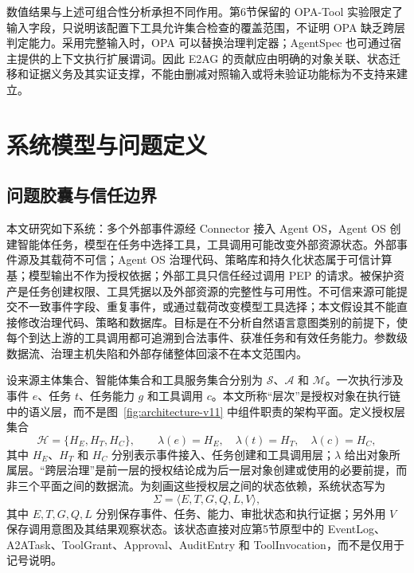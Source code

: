数值结果与上述可组合性分析承担不同作用。第6节保留的 OPA-Tool 实验限定了输入字段，只说明该配置下工具允许集合检查的覆盖范围，不证明 OPA 缺乏跨层判定能力。采用完整输入时，OPA 可以替换治理判定器；AgentSpec 也可通过宿主提供的上下文执行扩展谓词。因此 E2AG 的贡献应由明确的对象关联、状态迁移和证据义务及其实证支撑，不能由删减对照输入或将未验证功能标为不支持来建立。

\section{系统模型与问题定义}\label{sec:problem-v11}

\subsection{问题胶囊与信任边界}

本文研究如下系统：多个外部事件源经 Connector 接入 Agent OS，Agent OS 创建智能体任务，模型在任务中选择工具，工具调用可能改变外部资源状态。外部事件源及其载荷不可信；Agent OS 治理代码、策略库和持久化状态属于可信计算基；模型输出不作为授权依据；外部工具只信任经过调用 PEP 的请求。被保护资产是任务创建权限、工具凭据以及外部资源的完整性与可用性。不可信来源可能提交不一致事件字段、重复事件，或通过载荷改变模型工具选择；本文假设其不能直接修改治理代码、策略和数据库。目标是在不分析自然语言意图类别的前提下，使每个到达上游的工具调用都可追溯到合法事件、获准任务和有效任务能力。参数级数据流、治理主机失陷和外部存储整体回滚不在本文范围内。

设来源主体集合、智能体集合和工具服务集合分别为 $\mathcal{S}$、$\mathcal{A}$ 和 $\mathcal{M}$。一次执行涉及事件 $e$、任务 $t$、任务能力 $g$ 和工具调用 $c$。本文所称“层次”是授权对象在执行链中的语义层，而不是图~\ref{fig:architecture-v11} 中组件职责的架构平面。定义授权层集合
\begin{equation}
\mathcal{H}=\{H_E,H_T,H_C\},\qquad
\lambda(e)=H_E,\quad \lambda(t)=H_T,\quad \lambda(c)=H_C,
\label{eq:authorization-layers-v11}
\end{equation}
其中 $H_E$、$H_T$ 和 $H_C$ 分别表示事件接入、任务创建和工具调用层；$\lambda$ 给出对象所属层。“跨层治理”是前一层的授权结论成为后一层对象创建或使用的必要前提，而非三个平面之间的数据流。为刻画这些授权层之间的状态依赖，系统状态写为
\begin{equation}
\Sigma=\langle E,T,G,Q,L,V\rangle,
\label{eq:system-state-v11}
\end{equation}
其中 $E,T,G,Q,L$ 分别保存事件、任务、能力、审批状态和执行证据；另外用 $V$ 保存调用意图及其结果观察状态。该状态直接对应第5节原型中的 EventLog、A2ATask、ToolGrant、Approval、AuditEntry 和 ToolInvocation，而不是仅用于记号说明。

